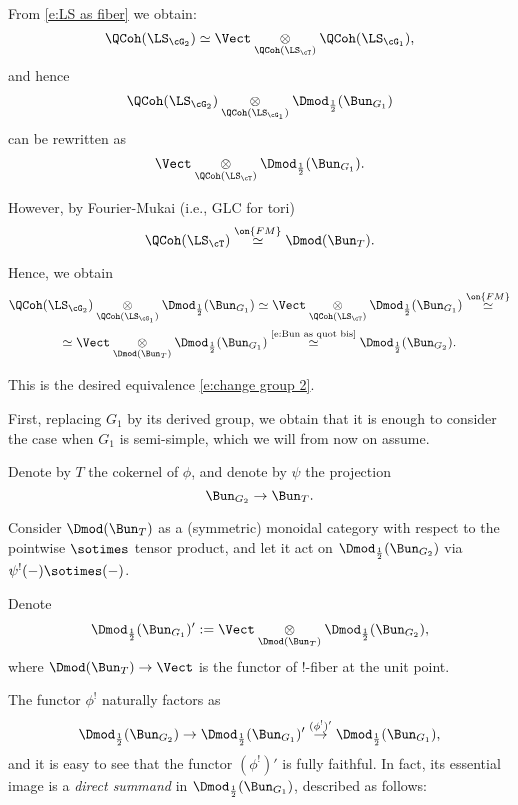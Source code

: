 \documentclass[9pt]{amsart}
\theoremstyle{remark}
\theoremstyle{definition}
\theoremstyle{remark}
\numberwithin{equation}{section}
\begin{document}
\medskip

From \eqref{e:LS as fiber} we obtain:
$$\QCoh(\LS_{\cG_2})\simeq \Vect\underset{\QCoh(\LS_\cT)}\otimes \QCoh(\LS_{\cG_1}),$$
and hence
$$\QCoh(\LS_{\cG_2})\underset{\QCoh(\LS_{\cG_1})}\otimes  \Dmod_{\frac{1}{2}}(\Bun_{G_1})$$
can be rewritten as 
$$\Vect\underset{\QCoh(\LS_\cT)}\otimes \Dmod_{\frac{1}{2}}(\Bun_{G_1}).$$

However, by Fourier-Mukai (i.e., GLC for tori)
$$\QCoh(\LS_\cT) \overset{\on{FM}}\simeq \Dmod(\Bun_T).$$

Hence, we obtain 
\begin{multline*}
\QCoh(\LS_{\cG_2})\underset{\QCoh(\LS_{\cG_1})}\otimes  \Dmod_{\frac{1}{2}}(\Bun_{G_1}) \simeq 
\Vect\underset{\QCoh(\LS_\cT)}\otimes \Dmod_{\frac{1}{2}}(\Bun_{G_1}) \overset{\on{FM}}\simeq \\
\simeq \Vect\underset{\Dmod(\Bun_T)}\otimes \Dmod_{\frac{1}{2}}(\Bun_{G_1})
\overset{\text{\eqref{e:Bun as quot bis}}}\simeq  \Dmod_{\frac{1}{2}}(\Bun_{G_2}).
\end{multline*}

This is the desired equivalence \eqref{e:change group 2}. 


First, replacing $G_1$ by its derived group, we obtain that it is enough to consider the case when $G_1$
is semi-simple, which we will from now on assume.

\medskip

Denote by $T$ the cokernel of $\phi$, and denote by $\psi$ the projection
$$\Bun_{G_2}\to \Bun_T.$$

Consider $\Dmod(\Bun_T)$ as a (symmetric) monoidal category with respect to the pointwise $\sotimes$ tensor product,
and let it act on $\Dmod_{\frac{1}{2}}(\Bun_{G_2})$ via $\psi^!(-)\sotimes (-)$. 

\medskip

Denote
\begin{equation} \label{e:neutral subcateg}
\Dmod_{\frac{1}{2}}(\Bun_{G_1})':=\Vect\underset{\Dmod(\Bun_T)}\otimes \Dmod_{\frac{1}{2}}(\Bun_{G_2}),
\end{equation} 
where $\Dmod(\Bun_T)\to \Vect$ is the functor of !-fiber at the unit point.

\medskip

The functor $\phi^!$ naturally factors as 
$$\Dmod_{\frac{1}{2}}(\Bun_{G_2})\to \Dmod_{\frac{1}{2}}(\Bun_{G_1})' \overset{(\phi^!)'}\to \Dmod_{\frac{1}{2}}(\Bun_{G_1}),$$
and it is easy to see that the functor $(\phi^!)'$ is fully faithful. In fact, its essential image is a \emph{direct summand} in 
$\Dmod_{\frac{1}{2}}(\Bun_{G_1})$, described as follows:
\end{document}
